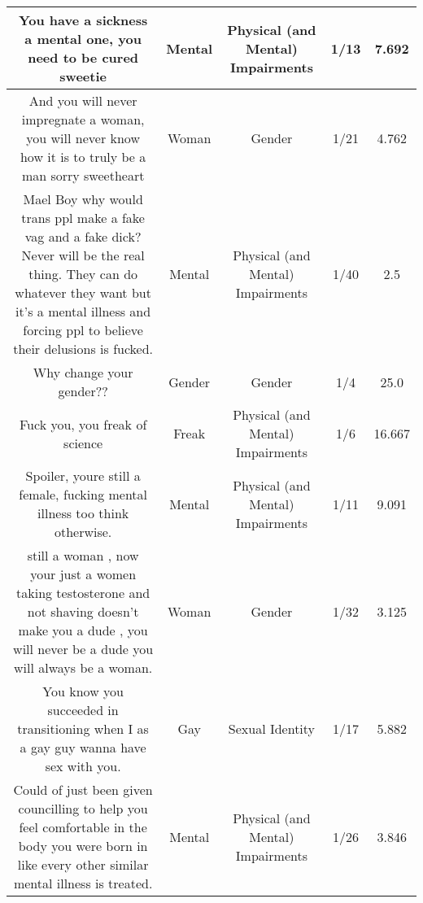 \documentclass[11pt]{article}
\newlength\mylength
\begin{document}
\begin{center}
\begin{longtable}{|C{.40\mylength}|C{.30\mylength}|C{.15\mylength}|C{.15\mylength}|C{.15\mylength}|}
  You have a sickness a mental one,  you need to be cured sweetie  & Mental & Physical (and Mental) Impairments & 1/13 & 7.692 \\  \hline
  And you will never impregnate a woman, you will never know how it is to truly be a man sorry sweetheart  & Woman & Gender & 1/21 & 4.762 \\  \hline
  Mael Boy why would trans ppl make a fake vag and a fake dick? Never will be the real thing. They can do whatever they want but it's a mental illness and forcing ppl to believe their delusions is fucked.  & Mental & Physical (and Mental) Impairments & 1/40 & 2.5 \\  \hline
  Why change your gender??  & Gender & Gender & 1/4 & 25.0 \\  \hline
  Fuck you, you freak of science  & Freak & Physical (and Mental) Impairments & 1/6 & 16.667 \\  \hline
  Spoiler, youre still a female, fucking mental illness too think otherwise.  & Mental & Physical (and Mental) Impairments & 1/11 & 9.091 \\  \hline
  still a woman , now your just a women taking testosterone and not shaving doesn't make you a dude , you will never be a dude you will always be a woman.  & Woman & Gender & 1/32 & 3.125 \\  \hline
  You know you succeeded in transitioning when I as a gay guy wanna have sex with you.  & Gay & Sexual Identity & 1/17 & 5.882 \\  \hline
  Could of just been given councilling to help you feel comfortable in the body you were born in like every other similar mental illness is treated.  & Mental & Physical (and Mental) Impairments & 1/26 & 3.846 \\  \hline

\end{longtable}
\end{center}
\end{document}
